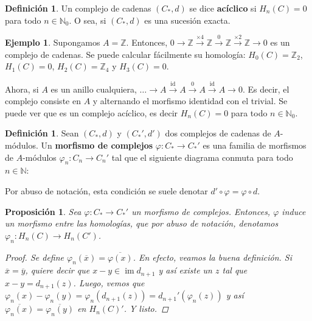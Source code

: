 \documentclass[12pt]{book}
\newtheorem{prop}[teo]{Proposición}
\theoremstyle{definition}
\newtheorem{defn}[teo]{Definición}
\newtheorem{ex}[teo]{Ejemplo}
\newcommand{\ZZ}{\mathbb{Z}}      %
\newcommand{\NN}{\mathbb{N}}
\DeclareMathOperator{\id}{id}
\DeclareMathOperator{\im}{im}
\begin{document}
\begin{defn}
Un complejo de cadenas $(C_*,d)$ se dice \textbf{acíclico} si $H_n(C)=0$ para todo $n\in\NN_0$. O sea, si $(C_*,d)$ es una sucesión exacta.
\end{defn}

\begin{ex}
Supongamos $A=\ZZ$. Entonces, $0\longrightarrow \ZZ\stackrel{\times 4}{\longrightarrow} \ZZ\stackrel{0}{\longrightarrow}\ZZ\stackrel{\times 2}{\longrightarrow} \ZZ\longrightarrow 0$ es un complejo de cadenas. Se puede calcular fácilmente su homología: $H_0(C)=\ZZ_2$, $H_1(C)=0$, $H_2(C)=\ZZ_4$ y $H_3(C)=0$.

Ahora, si $A$ es un anillo cualquiera, $\ldots\longrightarrow A\stackrel{\id}{\longrightarrow} A\stackrel{0}{\longrightarrow} A\stackrel{\id}{\longrightarrow} A\longrightarrow 0$. Es decir, el complejo consiste en $A$ y alternando el morfismo identidad con el trivial. Se puede ver que es un complejo acíclico, es decir $H_n(C)=0$ para todo $n\in\NN_0$.
\end{ex}

\begin{defn}
Sean $(C_*,d)$ y $(C_*',d')$ dos complejos de cadenas de $A$-módulos. Un \textbf{morfismo de complejos} $\varphi:C_*\to C_*'$ es una familia de morfismos de $A$-módulos $\varphi_n:C_n\to C_n'$ tal que el siguiente diagrama conmuta para todo $n\in\NN$:
\begin{center}\end{center} Por abuso de notación, esta condición se suele denotar $d'\circ \varphi = \varphi\circ d$.
\end{defn}

\begin{prop}
Sea $\varphi:C_*\to C_*'$ un morfismo de complejos. Entonces, $\varphi$ induce un morfismo entre las homologías, que por abuso de notación, denotamos $\varphi_n:H_n(C)\to H_n(C')$.
\begin{proof}
Se define $\varphi_n(\overline{x}) = \overline{\varphi(x)}$. En efecto, veamos la buena definición. Si $\overline{x}=\overline{y}$, quiere decir que $x-y\in \im d_{n+1}$ y así existe un $z$ tal que $x-y = d_{n+1}(z)$. Luego, vemos que $\varphi_n(x)-\varphi_n(y)=\varphi_n(d_{n+1}(z)) = d_{n+1}'(\varphi_n(z))$ y así $\overline{\varphi_n(x)} = \overline{\varphi_n(y)}$ en $H_n(C)'$. Y listo.
\end{proof}
\end{prop}
\end{document}
